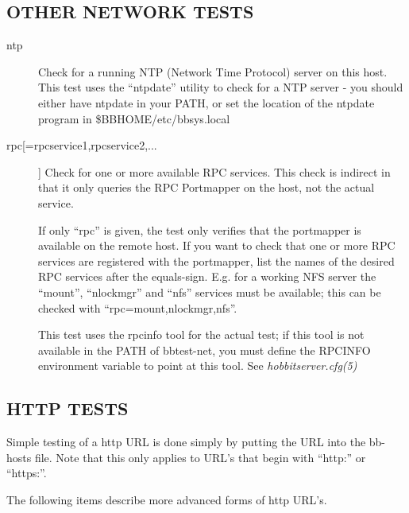 \subsection{OTHER NETWORK TESTS}
\begin{description}
\item[ntp] Check for a running NTP (Network Time Protocol) server on
  this host. This test uses the ``ntpdate'' utility to check for a NTP
  server - you should either have ntpdate in your PATH, or set the
  location of the ntpdate program in \$BBHOME/etc/bbsys.local 


 

\item[rpc[=rpcservice1,rpcservice2,...]] Check for one or more
  available RPC services. This check is indirect in that it only
  queries the RPC Portmapper on the host, not the actual service. 


  If only ``rpc'' is given, the test only verifies that the portmapper
  is available on the remote host. If you want to check that one or
  more RPC services are registered with the portmapper, list the names
  of the desired RPC services after the equals-sign. E.g. for a
  working NFS server the ``mount'', ``nlockmgr'' and ``nfs'' services
  must be available; this can be checked with
  ``rpc=mount,nlockmgr,nfs''. 



  This test uses the rpcinfo tool for the actual test; if this tool is
  not available in the PATH of bbtest-net, you must define the RPCINFO
  environment variable to point at this tool. See
  \emph{hobbitserver.cfg(5)}


\end{description}
\subsection{HTTP TESTS}
 Simple testing of a http URL is done simply by putting the URL into
 the bb-hosts file. Note that this only applies to URL's that begin
 with ``http:'' or ``https:''. 


  The following items describe more advanced forms of http URL's. 


